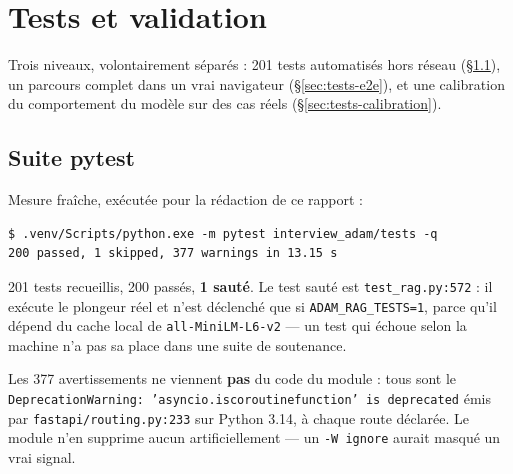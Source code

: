 \section{Tests et validation}
\label{sec:tests}

Trois niveaux, volontairement séparés : 201 tests automatisés hors réseau
(\S\ref{sec:tests-pytest}), un parcours complet dans un vrai navigateur
(\S\ref{sec:tests-e2e}), et une calibration du comportement du modèle sur des
cas réels (\S\ref{sec:tests-calibration}).

\subsection{Suite pytest}
\label{sec:tests-pytest}

Mesure fraîche, exécutée pour la rédaction de ce rapport :

\begin{lstlisting}[style=adamshell]
$ .venv/Scripts/python.exe -m pytest interview_adam/tests -q
200 passed, 1 skipped, 377 warnings in 13.15 s
\end{lstlisting}

201 tests recueillis, 200 passés, \textbf{1 sauté}. Le test sauté est
\texttt{test\_rag.py:572} : il exécute le plongeur réel et n'est déclenché que
si \texttt{ADAM\_RAG\_TESTS=1}, parce qu'il dépend du cache local de
\texttt{all-MiniLM-L6-v2} --- un test qui échoue selon la machine n'a pas sa
place dans une suite de soutenance.

Les 377 avertissements ne viennent \textbf{pas} du code du module : tous sont le
\texttt{DeprecationWarning: 'asyncio.\allowbreak iscoroutinefunction' is deprecated} émis
par \texttt{fastapi/routing.py:233} sur Python 3.14, à chaque route déclarée. Le
module n'en supprime aucun artificiellement --- un \texttt{-W ignore} aurait masqué
un vrai signal.

